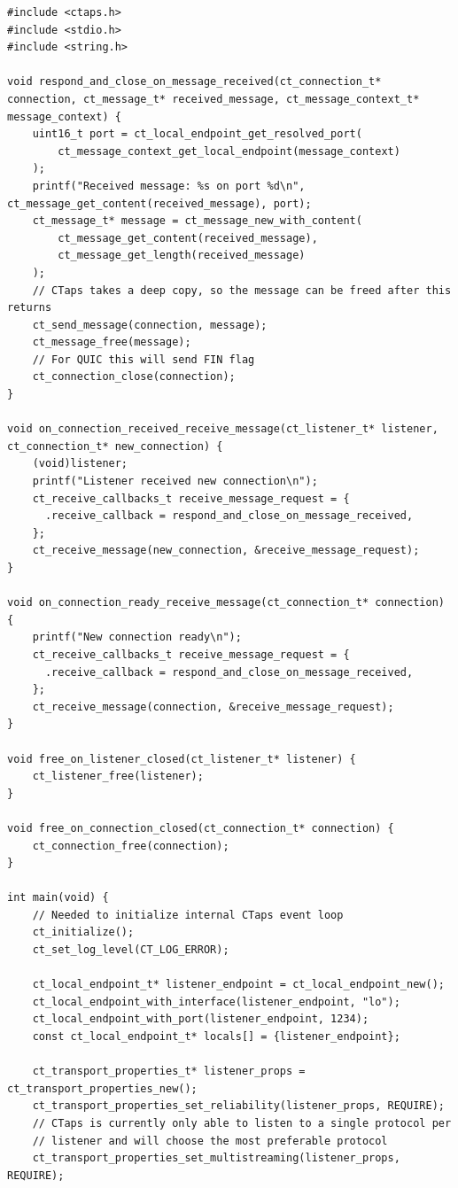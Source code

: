 \newpage
{%
  \captionsetup{type=listing}%
\begin{verbatim}
#include <ctaps.h>
#include <stdio.h>
#include <string.h>

void respond_and_close_on_message_received(ct_connection_t* connection, ct_message_t* received_message, ct_message_context_t* message_context) {
    uint16_t port = ct_local_endpoint_get_resolved_port(
        ct_message_context_get_local_endpoint(message_context)
    );
    printf("Received message: %s on port %d\n", ct_message_get_content(received_message), port);
    ct_message_t* message = ct_message_new_with_content(
        ct_message_get_content(received_message),
        ct_message_get_length(received_message)
    );
    // CTaps takes a deep copy, so the message can be freed after this returns
    ct_send_message(connection, message);
    ct_message_free(message);
    // For QUIC this will send FIN flag
    ct_connection_close(connection);
}

void on_connection_received_receive_message(ct_listener_t* listener, ct_connection_t* new_connection) {
    (void)listener;
    printf("Listener received new connection\n");
    ct_receive_callbacks_t receive_message_request = {
      .receive_callback = respond_and_close_on_message_received,
    };
    ct_receive_message(new_connection, &receive_message_request);
}

void on_connection_ready_receive_message(ct_connection_t* connection) {
    printf("New connection ready\n");
    ct_receive_callbacks_t receive_message_request = {
      .receive_callback = respond_and_close_on_message_received,
    };
    ct_receive_message(connection, &receive_message_request);
}

void free_on_listener_closed(ct_listener_t* listener) {
    ct_listener_free(listener);
}

void free_on_connection_closed(ct_connection_t* connection) {
    ct_connection_free(connection);
}

int main(void) {
    // Needed to initialize internal CTaps event loop
    ct_initialize();
    ct_set_log_level(CT_LOG_ERROR);

    ct_local_endpoint_t* listener_endpoint = ct_local_endpoint_new();
    ct_local_endpoint_with_interface(listener_endpoint, "lo");
    ct_local_endpoint_with_port(listener_endpoint, 1234);
    const ct_local_endpoint_t* locals[] = {listener_endpoint};

    ct_transport_properties_t* listener_props = ct_transport_properties_new();
    ct_transport_properties_set_reliability(listener_props, REQUIRE);
    // CTaps is currently only able to listen to a single protocol per
    // listener and will choose the most preferable protocol
    ct_transport_properties_set_multistreaming(listener_props, REQUIRE);


\end{verbatim}}

